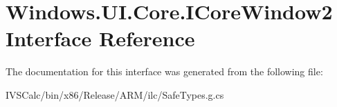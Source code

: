 \hypertarget{interface_windows_1_1_u_i_1_1_core_1_1_i_core_window2}{}\section{Windows.\+U\+I.\+Core.\+I\+Core\+Window2 Interface Reference}
\label{interface_windows_1_1_u_i_1_1_core_1_1_i_core_window2}


The documentation for this interface was generated from the following file\+:\begin{DoxyCompactItemize}
\item 
I\+V\+S\+Calc/bin/x86/\+Release/\+A\+R\+M/ilc/Safe\+Types.\+g.\+cs\end{DoxyCompactItemize}
